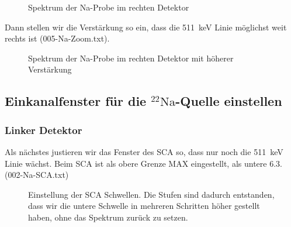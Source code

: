 \begin{figure}[htbp]
    \centering
    \label{mca:004}
    \caption{Spektrum der Na-Probe im rechten Detektor}
\end{figure}

Dann stellen wir die
Verstärkung so ein, dass die \SI{511}{\kilo\electronvolt} Linie möglichst weit
rechts ist (005-Na-Zoom.txt).

\begin{figure}[htbp]
    \centering
    \label{mca:005}
    \caption{Spektrum der Na-Probe im rechten Detektor mit höherer Verstärkung}
\end{figure}

\subsection{Einkanalfenster für die ${}^{22}\text{Na}$-Quelle einstellen}

\subsubsection{Linker Detektor}

Als nächstes justieren wir das
Fenster des SCA so, dass nur noch die \SI{511}{\kilo\electronvolt} Linie
wächst. Beim SCA ist als obere Grenze MAX eingestellt, als untere \num{6.3}.
(002-Na-SCA.txt)

\begin{figure}[htbp]
    \centering
    \label{mca:002}
    \caption{%
        Einstellung der SCA Schwellen. Die Stufen sind dadurch entstanden,
        dass wir die untere Schwelle in mehreren Schritten höher gestellt
        haben, ohne das Spektrum zurück zu setzen.
    }
\end{figure}

